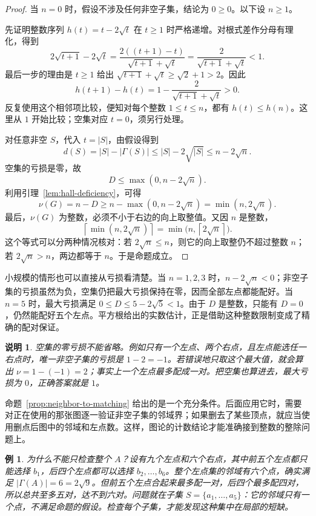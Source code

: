 \documentclass[UTF8,a4paper,oneside,openany,fontset=fandol,zihao=-4]{ctexbook}
\theoremstyle{guide}
\newtheorem{example}[theorem]{例}
\newtheorem{remark}[theorem]{说明}
\newcommand{\ceil}[1]{\left\lceil#1\right\rceil}
\begin{document}
\begin{proof}
当 $n=0$ 时，假设不涉及任何非空子集，结论为 $0\geq0$。以下设 $n\geq1$。

先证明整数序列 $h(t)=t-2\sqrt t$ 在 $t\geq1$ 时严格递增。对根式差作分母有理化，得到
\[
2\sqrt{t+1}-2\sqrt t
=\frac{2((t+1)-t)}{\sqrt{t+1}+\sqrt t}
=\frac{2}{\sqrt{t+1}+\sqrt t}<1.
\]
最后一步的理由是 $t\geq1$ 给出 $\sqrt{t+1}+\sqrt t\geq\sqrt2+1>2$。因此
\[
h(t+1)-h(t)=1-\frac{2}{\sqrt{t+1}+\sqrt t}>0.
\]
反复使用这个相邻项比较，便知对每个整数 $1\leq t\leq n$，都有 $h(t)\leq h(n)$。这里从 $1$ 开始比较；空集对应 $t=0$，须另行处理。

对任意非空 $S$，代入 $t=|S|$，由假设得到
\[
d(S)=|S|-|\Gamma(S)|
\leq |S|-2\sqrt{|S|}
\leq n-2\sqrt n.
\]
空集的亏损是零，故
\[
D\leq\max(0,n-2\sqrt n).
\]
利用引理~\ref{lem:hall-deficiency}，可得
\[
\nu(G)=n-D
\geq n-\max(0,n-2\sqrt n)
=\min(n,2\sqrt n).
\]
最后，$\nu(G)$ 为整数，必须不小于右边的向上取整值。又因 $n$ 是整数，
\[
\ceil{\min(n,2\sqrt n)}
=\min\bigl(n,\ceil{2\sqrt n}\bigr).
\]
这个等式可以分两种情况核对：若 $2\sqrt n\leq n$，则它的向上取整仍不超过整数 $n$；若 $2\sqrt n>n$，两边都等于 $n$。于是命题成立。
\end{proof}

小规模的情形也可以直接从亏损看清楚。当 $n=1,2,3$ 时，$n-2\sqrt n<0$；非空子集的亏损虽然为负，空集仍把最大亏损保持在零，因而全部左点都能配好。当 $n=5$ 时，最大亏损满足 $0\leq D\leq5-2\sqrt5<1$。由于 $D$ 是整数，只能有 $D=0$，仍然能配好五个左点。平方根给出的实数估计，正是借助这种整数限制变成了精确的配对保证。

\begin{remark}\label{mat:empty-set-warning}
空集的零亏损不能省略。例如只有一个左点、两个右点，且左点能选任一右点时，唯一非空子集的亏损是 $1-2=-1$。若错误地只取这个最大值，就会算出 $\nu=1-(-1)=2$；事实上一个左点最多配成一对。把空集也算进去，最大亏损为 $0$，正确答案就是 $1$。
\end{remark}

命题~\ref{prop:neighbor-to-matching} 给出的是一个充分条件。后面应用它时，需要对正在使用的那张图逐一验证非空子集的邻域界；如果删去了某些顶点，就应当使用删点后图中的邻域和左点数。这样，图论的计数结论才能准确接到整数的整除问题上。

\begin{example}\label{mat:why-all-subsets}
为什么不能只检查整个 $A$？设有九个左点和六个右点，其中前五个左点都只能选择 $b_1$，后四个左点都可以选择 $b_2,\ldots,b_6$。整个左点集的邻域有六个点，确实满足 $|\Gamma(A)|=6=2\sqrt9$。但前五个左点合起来最多配一对，后四个最多配四对，所以总共至多五对，达不到六对。问题就在子集 $S=\{a_1,\ldots,a_5\}$：它的邻域只有一个点，不满足命题的假设。检查每个子集，才能发现这种集中在局部的短缺。
\end{example}
\end{document}
